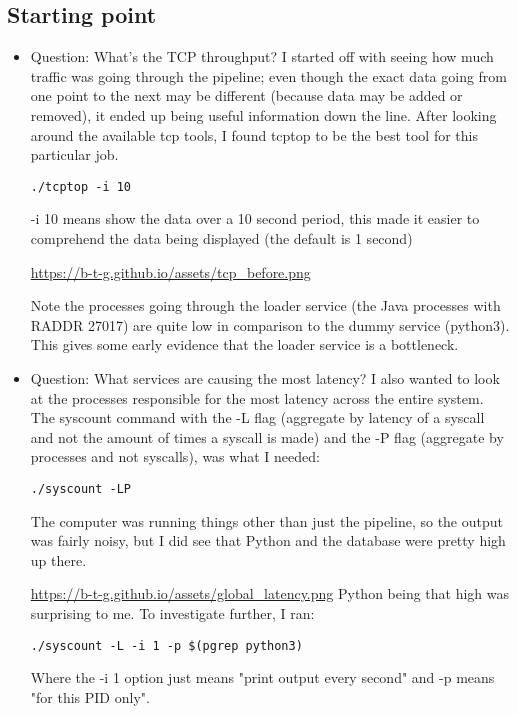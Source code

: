 \documentclass[11pt]{article}
\begin{document}
\subsection*{Starting point}
\label{sec:org7ebd56c}
\begin{itemize}
\item Question: What's the TCP throughput?
\label{sec:orgbf74694}
I started off with seeing how much traffic was going through the pipeline; even though the exact data going from one point to the next may be different (because data may be added or removed),
it ended up being useful information down the line. After looking around the available tcp tools, I found tcptop to be the best tool for this particular job.
\begin{verbatim}
./tcptop -i 10
\end{verbatim}

-i 10 means show the data over a 10 second period, this made it easier to comprehend the data being displayed (the default is 1 second)

\url{https://b-t-g.github.io/assets/tcp\_before.png}

Note the processes going through the loader service (the Java processes with RADDR 27017) are quite low in comparison to the dummy service (python3). This gives some early evidence that the loader
service is a bottleneck.

\item Question: What services are causing the most latency?
\label{sec:org843fd36}
I also wanted to look at the processes responsible for the most latency across the entire system. The syscount command with the -L flag (aggregate by latency of a syscall and not the amount of times a
syscall is made) and the -P flag (aggregate by processes and not syscalls), was what I needed:
\begin{verbatim}
./syscount -LP
\end{verbatim}
The computer was running things other than just the pipeline, so the output was fairly noisy, but I did see that Python and the database were pretty high up there.

\url{https://b-t-g.github.io/assets/global\_latency.png}
Python being that high was surprising to me. To investigate further, I ran:
\begin{verbatim}
./syscount -L -i 1 -p $(pgrep python3)
\end{verbatim}

Where the -i 1 option just means "print output every second" and -p means "for this PID only".


\end{itemize}
\end{document}

